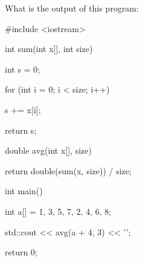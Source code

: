 What is the output of this program:



\begin{consolethree}[escapeinside=||]

#include <iostream>

int sum(int x[], int size)

{

    int s = 0;

    for (int i = 0; i < size; i++)

    {

        s += x[i];

    }

    return s;

}

double avg(int x[], size)

{

    return double(sum(x, size)) / size;

}

int main()

{

    int a[] = {1, 3, 5, 7, 2, 4, 6, 8};

    std::cout << avg(a + 4, 3) << '\n';

    return 0;

}

\end{consolethree}

